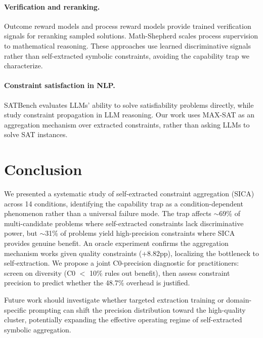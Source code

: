 \documentclass[11pt,a4paper]{article}
\begin{document}
\paragraph{Verification and reranking.}
Outcome reward models \citep{cobbe2021gsm8k} and process reward models \citep{lightman2023prm} provide trained verification signals for reranking sampled solutions. Math-Shepherd \citep{wang2024mathshepherd} scales process supervision to mathematical reasoning. These approaches use learned discriminative signals rather than self-extracted symbolic constraints, avoiding the capability trap we characterize.

\paragraph{Constraint satisfaction in NLP.}
SATBench \citep{satbench2025} evaluates LLMs' ability to solve satisfiability problems directly, while \citet{llm_constraint2025} study constraint propagation in LLM reasoning. Our work uses MAX-SAT as an aggregation mechanism over extracted constraints, rather than asking LLMs to solve SAT instances.

\section{Conclusion}

We presented a systematic study of self-extracted constraint aggregation (SICA) across 14 conditions, identifying the capability trap as a condition-dependent phenomenon rather than a universal failure mode. The trap affects $\sim$69\% of multi-candidate problems where self-extracted constraints lack discriminative power, but $\sim$31\% of problems yield high-precision constraints where SICA provides genuine benefit. An oracle experiment confirms the aggregation mechanism works given quality constraints (+8.82pp), localizing the bottleneck to self-extraction. We propose a joint C0-precision diagnostic for practitioners: screen on diversity (C0 $<$ 10\% rules out benefit), then assess constraint precision to predict whether the 48.7\% overhead is justified.

Future work should investigate whether targeted extraction training or domain-specific prompting can shift the precision distribution toward the high-quality cluster, potentially expanding the effective operating regime of self-extracted symbolic aggregation.
\end{document}
